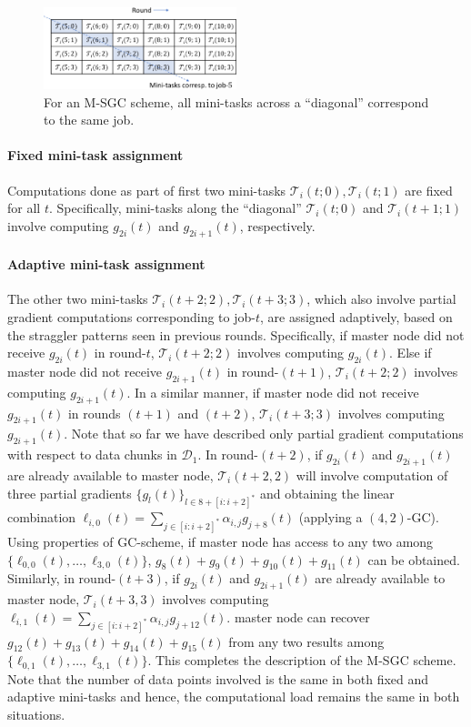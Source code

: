 \begin{figure}[h]
    \centering
    \includegraphics[width=0.5\textwidth]{figs/ch2/fig_B_SGC_example_diag_minitasks_v2}
    \vspace{5pt}
    \caption{
    For an M-SGC scheme, all mini-tasks across a ``diagonal'' correspond to the same job.
    }
    \label{ch2:fig:b_sgc_mini_task_diagonal}
\end{figure}

\paragraph{Fixed mini-task assignment} Computations done as part of first two mini-tasks $\mathcal{T}_i(t;0),\mathcal{T}_i(t;1)$ are fixed for all $t$. Specifically, mini-tasks along the ``diagonal'' $\mathcal{T}_i(t;0)$ and $\mathcal{T}_i(t+1;1)$ involve computing $g_{2i}(t)$ and $g_{2i+1}(t)$, respectively. 

\paragraph{Adaptive mini-task assignment} The other two mini-tasks $\mathcal{T}_i(t+2;2),\mathcal{T}_i(t+3;3)$, which also involve partial gradient computations corresponding to job-$t$, are assigned adaptively, based on the straggler patterns seen in previous rounds. Specifically, if master node did not receive $g_{2i}(t)$ in round-$t$, $\mathcal{T}_i(t+2;2)$ involves computing $g_{2i}(t)$. Else if master node did not receive $g_{2i+1}(t)$ in round-$(t+1)$, $\mathcal{T}_i(t+2;2)$ involves computing $g_{2i+1}(t)$. {In a similar manner, if master node did not receive $g_{2i+1}(t)$ in rounds $(t+1)$ and $(t+2)$, $\mathcal{T}_i(t+3;3)$ involves computing $g_{2i+1}(t)$.} Note that so far we have described only partial gradient computations with respect to data chunks in $\mathcal{D}_1$. In round-$(t+2)$, if $g_{2i}(t)$ and $g_{2i+1}(t)$ are already available to master node, $\mathcal{T}_i(t+2,2)$ will involve computation of three partial gradients $\{g_l(t)\}_{l\in 8+[i:i+2]^*}$ and obtaining the linear combination $\ell_{i,0}(t)=\sum_{j\in[i:i+2]^*}\alpha_{i,j}g_{j+8}(t)$ (applying a $(4,2)$-GC). Using properties of GC-scheme, if master node has access to any two among $\{\ell_{0,0}(t),\ldots,\ell_{3,0}(t)\}$, $g_8(t)+g_9(t)+g_{10}(t)+g_{11}(t)$ can be obtained. Similarly, in round-$(t+3)$, if $g_{2i}(t)$ and $g_{2i+1}(t)$ are already available to master node, $\mathcal{T}_i(t+3,3)$ involves computing  $\ell_{i,1}(t)=\sum_{j\in[i:i+2]^*}\alpha_{i,j}g_{j+12}(t)$. master node can recover $g_{12}(t)+g_{13}(t)+g_{14}(t)+g_{15}(t)$ from any two results among $\{\ell_{0,1}(t),\ldots,\ell_{3,1}(t)\}$. This completes the description of the M-SGC scheme. Note that the number of data points involved is the same in both fixed and adaptive mini-tasks and hence, the computational load remains the same in both situations. 

